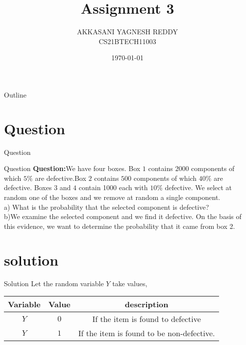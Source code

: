 \documentclass{beamer}
\title{Assignment 3}
\author{AKKASANI YAGNESH REDDY \\
     CS21BTECH11003 }
\date{\today}
\begin{document}
     \begin{frame}
     \maketitle    
     \end{frame}
     
     \logo{}
     
     \begin{frame}{Outline}
    \tableofcontents
     \end{frame}
     
     
     \section{Question}
     \begin{frame}{Question}
     \begin{block}{Question}
     \textbf{Question:}We have four boxes. Box $1$ contains $2000$ components of which $5\%$ are defective.Box $2$ contains $500$ components of which $40\%$ are defective. Boxes $3$ and $4$ contain 1000 each with $10\%$ defective. We select at random one of the boxes and we remove at random a single component.\\
     a) What is the probability that the selected component is defective?\\
     b)We examine the selected component and we find it defective. On the basis of this evidence, we want to determine the probability that it came from box 2.
     
         
     \end{block}
         
     \end{frame}
     
     
     \section{solution}
     \begin{frame}{Solution}
         Let the random variable $Y$ take values,\\
     \begin{table}[h!]
    \centering
    \begin{tabular}{|c|c|c|} \hline
    \textbf{Variable} & \textbf{Value} & \textbf{description} \\ \hline
         $Y$ & $0$ & If the item is found to defective \\ \hline
         $Y$ & $1$ & If the item is found to be non-defective.\\ \hline
     \end{tabular}
     \end{table}
     \end{frame}
     
\end{document}
